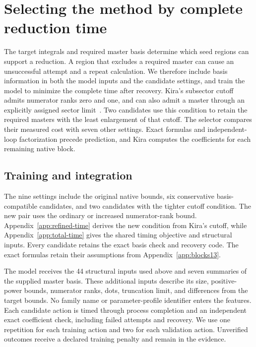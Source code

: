 \section{Selecting the method by complete reduction time}
\label{sec:refined-time}
The target integrals and required master basis determine which seed regions can support a reduction. A region that excludes a required master can cause an unsuccessful attempt and a repeat calculation. We therefore include basis information in both the model inputs and the candidate settings, and train the model to minimize the complete time after recovery. Kira's subsector cutoff admits numerator ranks zero and one, and can also admit a master through an explicitly assigned sector limit~\cite{Kira3}. Two candidates use this condition to retain the required masters with the least enlargement of that cutoff. The selector compares their measured cost with seven other settings. Exact formulas and independent-loop factorization precede prediction, and Kira computes the coefficients for each remaining native block.

\subsection{Training and integration}
The nine settings include the original native bounds, six conservative basis-compatible candidates, and two candidates with the tighter cutoff condition. The new pair uses the ordinary or increased numerator-rank bound. Appendix~\ref{app:refined-time} derives the new condition from Kira's cutoff, while Appendix~\ref{app:total-time} gives the shared timing objective and structural inputs. Every candidate retains the exact basis check and recovery code. The exact formulas retain their assumptions from Appendix~\ref{app:blocks13}.

The model receives the 44 structural inputs used above and seven summaries of the supplied master basis. These additional inputs describe its size, positive-power bounds, numerator ranks, dots, truncation limit, and differences from the target bounds. No family name or parameter-profile identifier enters the features. Each candidate action is timed through process completion and an independent exact coefficient check, including failed attempts and recovery. We use one repetition for each training action and two for each validation action. Unverified outcomes receive a declared training penalty and remain in the evidence.

